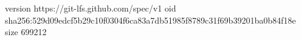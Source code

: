 version https://git-lfs.github.com/spec/v1
oid sha256:529d09edcf5b29c10f0304f6ca83a7db51985f8789c31f69b39201ba0b84f18e
size 699212
